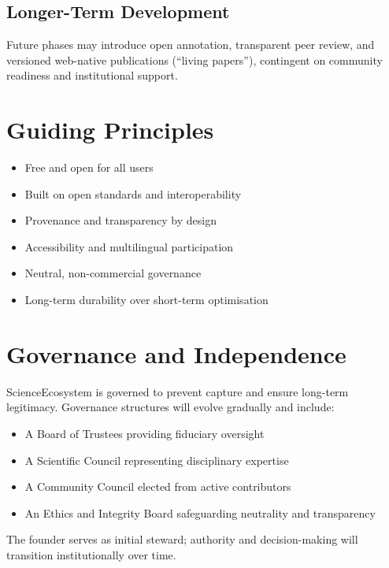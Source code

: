 \documentclass[11pt,a4paper]{article}
\begin{document}
\subsection*{Longer-Term Development}
Future phases may introduce open annotation, transparent peer review, and versioned web-native publications (“living papers”), contingent on community readiness and institutional support.

\section{Guiding Principles}

\begin{itemize}
    \item Free and open for all users
    \item Built on open standards and interoperability
    \item Provenance and transparency by design
    \item Accessibility and multilingual participation
    \item Neutral, non-commercial governance
    \item Long-term durability over short-term optimisation
\end{itemize}

\section{Governance and Independence}

ScienceEcosystem is governed to prevent capture and ensure long-term legitimacy. Governance structures will evolve gradually and include:
\begin{itemize}
    \item A Board of Trustees providing fiduciary oversight
    \item A Scientific Council representing disciplinary expertise
    \item A Community Council elected from active contributors
    \item An Ethics and Integrity Board safeguarding neutrality and transparency
\end{itemize}

The founder serves as initial steward; authority and decision-making will transition institutionally over time.

\end{document}
